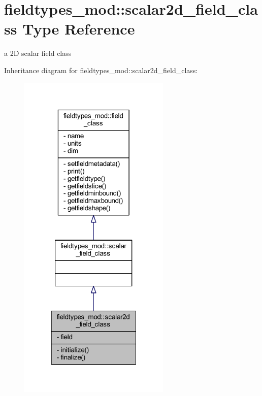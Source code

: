 \hypertarget{structfieldtypes__mod_1_1scalar2d__field__class}{}\section{fieldtypes\+\_\+mod\+:\+:scalar2d\+\_\+field\+\_\+class Type Reference}
\label{structfieldtypes__mod_1_1scalar2d__field__class}


a 2D scalar field class  




Inheritance diagram for fieldtypes\+\_\+mod\+:\+:scalar2d\+\_\+field\+\_\+class\+:\nopagebreak
\begin{figure}[H]
\begin{center}
\leavevmode
\includegraphics[width=205pt]{structfieldtypes__mod_1_1scalar2d__field__class__inherit__graph}
\end{center}
\end{figure}


